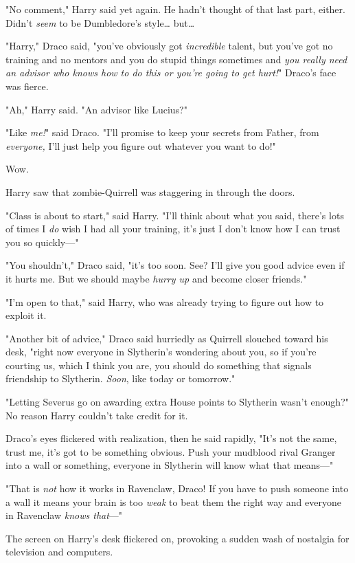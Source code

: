 "No comment," Harry said yet again. He hadn't thought of that last part, either. Didn't \emph{seem} to be Dumbledore's style{\ldots} but{\ldots}

"Harry," Draco said, "you've obviously got \emph{incredible} talent, but you've got no training and no mentors and you do stupid things sometimes and \emph{you really need an advisor who knows how to do this or you're going to get hurt!}" Draco's face was fierce.

"Ah," Harry said. "An advisor like Lucius?"

"Like \emph{me!}" said Draco. "I'll promise to keep your secrets from Father, from \emph{everyone,} I'll just help you figure out whatever you want to do!"

Wow.

Harry saw that zombie-Quirrell was staggering in through the doors.

"Class is about to start," said Harry. "I'll think about what you said, there's lots of times I \emph{do} wish I had all your training, it's just I don't know how I can trust you so quickly---"

"You shouldn't," Draco said, "it's too soon. See? I'll give you good advice even if it hurts me. But we should maybe \emph{hurry up} and become closer friends."

"I'm open to that," said Harry, who was already trying to figure out how to exploit it.

"Another bit of advice," Draco said hurriedly as Quirrell slouched toward his desk, "right now everyone in Slytherin's wondering about you, so if you're courting us, which I think you are, you should do something that signals friendship to Slytherin. \emph{Soon}, like today or tomorrow."

"Letting Severus go on awarding extra House points to Slytherin wasn't enough?" No reason Harry couldn't take credit for it.

Draco's eyes flickered with realization, then he said rapidly, "It's not the same, trust me, it's got to be something obvious. Push your mudblood rival Granger into a wall or something, everyone in Slytherin will know what that means---"

"That is \emph{not} how it works in Ravenclaw, Draco! If you have to push someone into a wall it means your brain is too \emph{weak} to beat them the right way and everyone in Ravenclaw \emph{knows that}---"

The screen on Harry's desk flickered on, provoking a sudden wash of nostalgia for television and computers.

